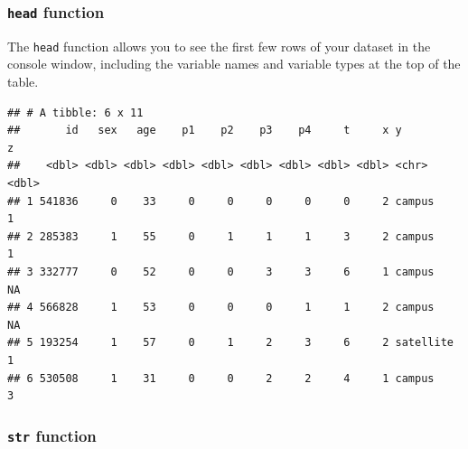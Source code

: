 \documentclass[]{book}
\newenvironment{Shaded}{\begin{snugshade}}{\end{snugshade}}
\newcommand{\CommentTok}[1]{\textcolor[rgb]{0.56,0.35,0.01}{\textit{#1}}}
\newcommand{\KeywordTok}[1]{\textcolor[rgb]{0.13,0.29,0.53}{\textbf{#1}}}
\newcommand{\NormalTok}[1]{#1}
\newcommand{\OperatorTok}[1]{\textcolor[rgb]{0.81,0.36,0.00}{\textbf{#1}}}
\newcommand{\StringTok}[1]{\textcolor[rgb]{0.31,0.60,0.02}{#1}}
\begin{document}
\begin{Shaded}
\end{Shaded}

\hypertarget{head-function-1}{%
\subsubsection{\texorpdfstring{\texttt{head}
function}{head function}}\label{head-function-1}}

The \texttt{head} function allows you to see the first few rows of your
dataset in the console window, including the variable names and variable
types at the top of the table.

\begin{Shaded}
\end{Shaded}

\begin{verbatim}
## # A tibble: 6 x 11
##       id   sex   age    p1    p2    p3    p4     t     x y             z
##    <dbl> <dbl> <dbl> <dbl> <dbl> <dbl> <dbl> <dbl> <dbl> <chr>     <dbl>
## 1 541836     0    33     0     0     0     0     0     2 campus        1
## 2 285383     1    55     0     1     1     1     3     2 campus        1
## 3 332777     0    52     0     0     3     3     6     1 campus       NA
## 4 566828     1    53     0     0     0     1     1     2 campus       NA
## 5 193254     1    57     0     1     2     3     6     2 satellite     1
## 6 530508     1    31     0     0     2     2     4     1 campus        3
\end{verbatim}

\hypertarget{str-function-1}{%
\subsubsection{\texorpdfstring{\texttt{str}
function}{str function}}\label{str-function-1}}
\end{document}
